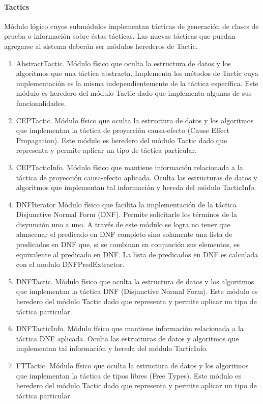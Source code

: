\documentclass[a4paper,10pt]{report}
\begin{document}
				\paragraph{Tactics}
				Módulo lógico cuyos submódulos implementan tácticas de generación de clases de prueba o información sobre éstas tácticas. Las nuevas tácticas que puedan agregarse al sistema deberán ser módulos herederos de Tactic.
					\begin{enumerate}
						\item{AbstractTactic. Módulo físico que oculta la estructura de datos y los algoritmos que una táctica abstracta. Implementa los métodos de Tactic cuya implementación es la misma independientemente de la táctica específica. Este módulo es heredero del módulo Tactic dado que implementa algunas de sus funcionalidades.}
						\item{CEPTactic. Módulo físico que oculta la estructura de datos y los algoritmos que implementan la táctica de proyección causa-efecto (Cause Effect Propagation). Este módulo es heredero del módulo Tactic dado que representa y permite aplicar un tipo de táctica particular.}
						\item{CEPTacticInfo. Módulo físico que mantiene información relacionada a la táctica de proyección causa-efecto aplicada. Oculta las estructuras de datos y algoritmos que implementan tal información y hereda del módulo TacticInfo.}
						\item{DNFIterator} Módulo físico que facilita la implementación de la táctica Disjunctive Normal Form (DNF). Permite solicitarle los términos de la disyunción uno a uno. A través de este módulo se logra no tener que almacenar el predicado en DNF completo sino solamente una lista de predicados en DNF que, si se combinan en conjunción sus elementos, es equivalente al predicado en DNF. La lista de predicados en DNF es calculada con el modulo DNFPredExtractor. 
						\item{DNFTactic. Módulo físico que oculta la estructura de datos y los algoritmos que implementan la táctica DNF (Disjunctive Normal Form). Este módulo es heredero del módulo Tactic dado que representa y permite aplicar un tipo de táctica particular.}
						\item{DNFTacticInfo. Módulo físico que mantiene información relacionada a la táctica DNF aplicada. Oculta las estructuras de datos y algoritmos que implementan tal información y hereda del módulo TacticInfo.}
						\item{FTTactic. Módulo físico que oculta la estructura de datos y los algoritmos que implementan la táctica de tipos libres (Free Types). Este módulo es heredero del módulo Tactic dado que representa y permite aplicar un tipo de táctica particular.}

\end{enumerate}
\end{document}
